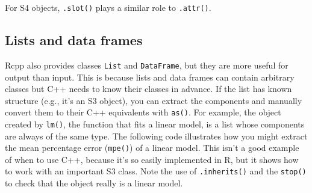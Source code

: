 For S4 objects, \texttt{.slot()} plays a similar role to
\texttt{.attr()}.

\subsection{Lists and data frames}

Rcpp also provides classes \texttt{List} and \texttt{DataFrame}, but
they are more useful for output than input. This is because lists and
data frames can contain arbitrary classes but C++ needs to know their
classes in advance. If the list has known structure (e.g., it's an S3
object), you can extract the components and manually convert them to
their C++ equivalents with \texttt{as()}. For example, the object
created by \texttt{lm()}, the function that fits a linear model, is a
list whose components are always of the same type. The following code
illustrates how you might extract the mean percentage error
(\texttt{mpe()}) of a linear model. This isn't a good example of when to
use C++, because it's so easily implemented in R, but it shows how to
work with an important S3 class. Note the use of \texttt{.inherits()}
and the \texttt{stop()} to check that the object really is a linear
model.  

\begin{Shaded}
\begin{Highlighting}[]
  

 
   \NormalTok{);}

  \NormalTok{NumericVector resid = as<NumericVector>(mod[}\NormalTok{]);}
  \NormalTok{NumericVector fitted = as<NumericVector>(mod[}\NormalTok{]);}

   
   \NormalTok{;}
  \NormalTok{(} 
  \NormalTok{\}}
   
\NormalTok{\}}
\end{Highlighting}
\end{Shaded}

